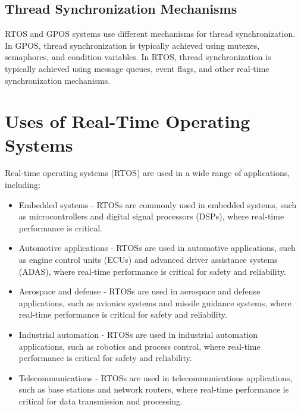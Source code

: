 \documentclass{article}
\begin{document}
\subsection{Thread Synchronization Mechanisms}
\label{sec:thread-synchronization}
RTOS and GPOS systems use different mechanisms for thread synchronization.
In GPOS, thread synchronization is typically achieved using mutexes, semaphores, and condition variables.
In RTOS, thread synchronization is typically achieved using message queues, event flags, and other real-time synchronization mechanisms.\cite{ThreadSynchronization}

\section{Uses of Real-Time Operating Systems}
\label{sec:uses-of-rtos}
Real-time operating systems (RTOS) are used in a wide range of applications, including:
\begin{itemize}
    \item  Embedded systems - RTOSs are commonly used in embedded systems, such as microcontrollers and digital signal processors (DSPs), where real-time performance is critical.
    \item  Automotive applications - RTOSs are used in automotive applications, such as engine control units (ECUs) and advanced driver assistance systems (ADAS), where real-time performance is critical for safety and reliability.
    \item  Aerospace and defense - RTOSs are used in aerospace and defense applications, such as avionics systems and missile guidance systems, where real-time performance is critical for safety and reliability.
    \item  Industrial automation - RTOSs are used in industrial automation applications, such as robotics and process control, where real-time performance is critical for safety and reliability.
    \item  Telecommunications - RTOSs are used in telecommunications applications, such as base stations and network routers, where real-time performance is critical for data transmission and processing.
\end{itemize}
\end{document}
